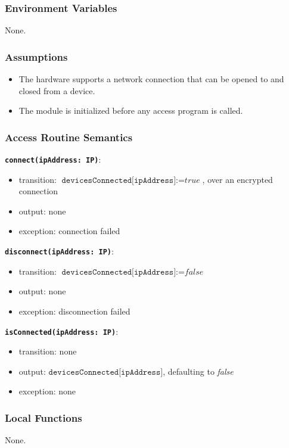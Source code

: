\documentclass[12pt, titlepage]{article}
\begin{document}
\subsubsection{Environment Variables}
None.

\subsubsection{Assumptions}
\begin{itemize}
  \item The hardware supports a network connection that can be opened to and closed from a device.
  \item The module is initialized before any access program is called.
\end{itemize}

\subsubsection{Access Routine Semantics}

\textbf{\texttt{connect(ipAddress: IP)}}:
\begin{itemize}
  \item transition: $\texttt{devicesConnected[ipAddress]} := \textit{true}$, over an encrypted connection
  \item output: none
  \item exception: connection failed
\end{itemize}

\textbf{\texttt{disconnect(ipAddress: IP)}}:
\begin{itemize}
  \item transition: $\texttt{devicesConnected[ipAddress]} := \textit{false}$
  \item output: none
  \item exception: disconnection failed
\end{itemize}

\textbf{\texttt{isConnected(ipAddress: IP)}}:
\begin{itemize}
  \item transition: none
  \item output: $\texttt{devicesConnected[ipAddress]}$, defaulting to \textit{false}
  \item exception: none
\end{itemize}

\subsubsection{Local Functions}
None.
\end{document}
